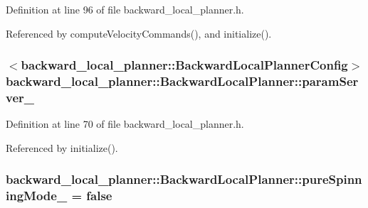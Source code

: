 Definition at line 96 of file backward\+\_\+local\+\_\+planner.\+h.



Referenced by compute\+Velocity\+Commands(), and initialize().

\subsubsection[{\texorpdfstring{param\+Server\+\_\+}{paramServer_}}]{$<$backward\+\_\+local\+\_\+planner\+::\+Backward\+Local\+Planner\+Config$>$ backward\+\_\+local\+\_\+planner\+::\+Backward\+Local\+Planner\+::param\+Server\+\_\+\hspace{0.3cm}{\ttfamily [private]}}\hypertarget{classbackward__local__planner_1_1BackwardLocalPlanner_a953b593550c975f1c9caf0ed0c3143a5}{}\label{classbackward__local__planner_1_1BackwardLocalPlanner_a953b593550c975f1c9caf0ed0c3143a5}


Definition at line 70 of file backward\+\_\+local\+\_\+planner.\+h.



Referenced by initialize().

\subsubsection[{\texorpdfstring{pure\+Spinning\+Mode\+\_\+}{pureSpinningMode_}}]{ backward\+\_\+local\+\_\+planner\+::\+Backward\+Local\+Planner\+::pure\+Spinning\+Mode\+\_\+ = false\hspace{0.3cm}{\ttfamily [private]}}\hypertarget{classbackward__local__planner_1_1BackwardLocalPlanner_a04a769cc9f1ae5170b06c92edfbb80f6}{}\label{classbackward__local__planner_1_1BackwardLocalPlanner_a04a769cc9f1ae5170b06c92edfbb80f6}


